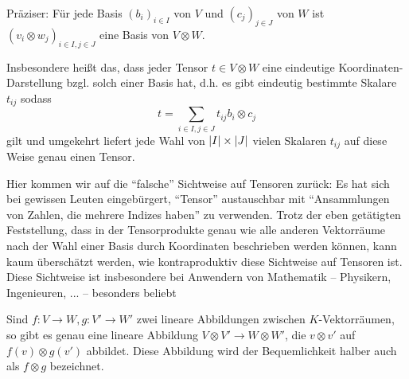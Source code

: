 {\begin{lemma}
Präziser: Für jede Basis $(b_i)_{i\in I}$ von $V$ und $(c_j)_{j\in J}$ von $W$ ist $(v_i\otimes w_j)_{i\in I, j\in J}$ eine Basis von $V\otimes W$.
\end{lemma}

\begin{remark}
Insbesondere heißt das, dass jeder Tensor $t\in V\otimes W$ eine eindeutige Koordinaten-Darstellung bzgl. solch einer Basis hat, d.h. es gibt eindeutig bestimmte Skalare $t_{ij}$ sodass
\[t = \sum_{i\in I, j\in J} t_{ij} b_i\otimes c_j\]
gilt und umgekehrt liefert jede Wahl von $\lvert I\rvert\times \lvert J\rvert$ vielen Skalaren $t_{ij}$ auf diese Weise genau einen Tensor.

Hier kommen wir auf die \enquote{falsche} Sichtweise auf Tensoren zurück: Es hat sich bei gewissen Leuten eingebürgert, \enquote{Tensor} austauschbar mit \enquote{Ansammlungen von Zahlen, die mehrere Indizes haben} zu verwenden. Trotz der eben getätigten Feststellung, dass in der Tensorprodukte genau wie alle anderen Vektorräume nach der Wahl einer Basis durch Koordinaten beschrieben werden können, kann kaum überschätzt werden, wie kontraproduktiv diese Sichtweise auf Tensoren ist. Diese Sichtweise ist insbesondere bei Anwendern von Mathematik -- Physikern, Ingenieuren, ... -- besonders beliebt
\end{remark}

\begin{lemma}
Sind $f:V\to W, g: V'\to W'$ zwei lineare Abbildungen zwischen $K$-Vektorräumen, so gibt es genau eine lineare Abbildung $V\otimes V'  \to W\otimes W'$, die $v\otimes v'$ auf $f(v)\otimes g(v')$ abbildet. Diese Abbildung wird der Bequemlichkeit halber auch als $f\otimes g$ bezeichnet.
\end{lemma}

}
